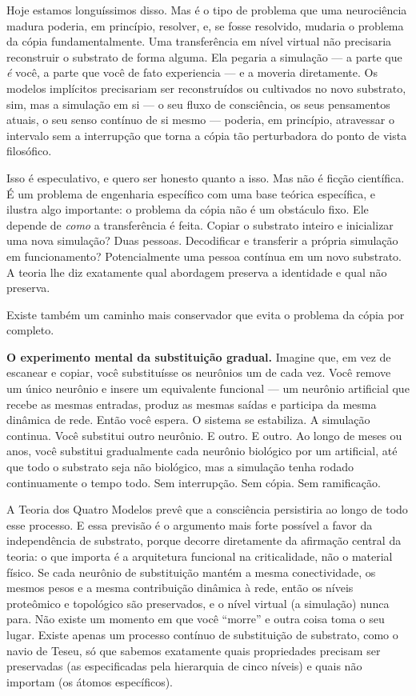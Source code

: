 \documentclass[11pt, twoside, openright]{book}
\begin{document}
Hoje estamos longuíssimos disso. Mas é o tipo de problema que uma neurociência madura poderia, em princípio, resolver, e, se fosse resolvido, mudaria o problema da cópia fundamentalmente. Uma transferência em nível virtual não precisaria reconstruir o substrato de forma alguma. Ela pegaria a simulação --- a parte que \textit{é} você, a parte que você de fato experiencia --- e a moveria diretamente. Os modelos implícitos precisariam ser reconstruídos ou cultivados no novo substrato, sim, mas a simulação em si --- o seu fluxo de consciência, os seus pensamentos atuais, o seu senso contínuo de si mesmo --- poderia, em princípio, atravessar o intervalo sem a interrupção que torna a cópia tão perturbadora do ponto de vista filosófico.

Isso é especulativo, e quero ser honesto quanto a isso. Mas não é ficção científica. É um problema de engenharia específico com uma base teórica específica, e ilustra algo importante: o problema da cópia não é um obstáculo fixo. Ele depende de \textit{como} a transferência é feita. Copiar o substrato inteiro e inicializar uma nova simulação? Duas pessoas. Decodificar e transferir a própria simulação em funcionamento? Potencialmente uma pessoa contínua em um novo substrato. A teoria lhe diz exatamente qual abordagem preserva a identidade e qual não preserva.

Existe também um caminho mais conservador que evita o problema da cópia por completo.

\textbf{O experimento mental da substituição gradual.} Imagine que, em vez de escanear e copiar, você substituísse os neurônios um de cada vez. Você remove um único neurônio e insere um equivalente funcional --- um neurônio artificial que recebe as mesmas entradas, produz as mesmas saídas e participa da mesma dinâmica de rede. Então você espera. O sistema se estabiliza. A simulação continua. Você substitui outro neurônio. E outro. E outro. Ao longo de meses ou anos, você substitui gradualmente cada neurônio biológico por um artificial, até que todo o substrato seja não biológico, mas a simulação tenha rodado continuamente o tempo todo. Sem interrupção. Sem cópia. Sem ramificação.

A Teoria dos Quatro Modelos prevê que a consciência persistiria ao longo de todo esse processo. E essa previsão é o argumento mais forte possível a favor da independência de substrato, porque decorre diretamente da afirmação central da teoria: o que importa é a arquitetura funcional na criticalidade, não o material físico. Se cada neurônio de substituição mantém a mesma conectividade, os mesmos pesos e a mesma contribuição dinâmica à rede, então os níveis proteômico e topológico são preservados, e o nível virtual (a simulação) nunca para. Não existe um momento em que você ``morre'' e outra coisa toma o seu lugar. Existe apenas um processo contínuo de substituição de substrato, como o navio de Teseu, só que sabemos exatamente quais propriedades precisam ser preservadas (as especificadas pela hierarquia de cinco níveis) e quais não importam (os átomos específicos).
\end{document}

